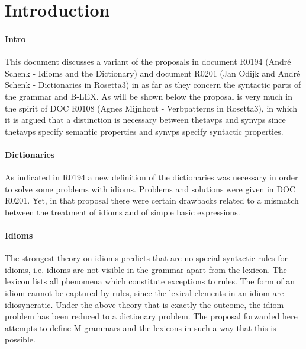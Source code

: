 

   \RosDate{\today}
   \RosSupersedes{-}
   \MakeRosTitle
%
%

\section{Introduction}
\paragraph{Intro}
This document discusses a variant of the proposals in document R0194 (Andr\'{e}
Schenk - Idioms and the Dictionary) and document R0201 (Jan Odijk and Andr\'{e}
Schenk - Dictionaries in Rosetta3) in as far as they concern the syntactic 
parts of the grammar and B-LEX. As will be shown below the proposal is very 
much in the spirit of DOC R0108 (Agnes Mijnhout - Verbpatterns in Rosetta3), in 
which it is argued that a distinction is necessary between thetavps and synvps 
since thetavps specify semantic properties and synvps specify syntactic 
properties.

\paragraph{Dictionaries}
As indicated in R0194 a new definition of the dictionaries was necessary in
order to solve some problems with idioms. Problems and solutions were given in
DOC R0201. Yet, in that proposal there were certain drawbacks related to a
mismatch between the treatment of idioms and of simple basic expressions. 

\paragraph{Idioms}
The strongest theory on idioms predicts that are no special syntactic rules for
idioms, i.e. idioms are not visible in the grammar apart from the lexicon. The
lexicon lists all phenomena which constitute exceptions to rules. The form of
an idiom cannot be captured by rules, since the lexical elements in an idiom
are idiosyncratic. Under the above theory that is exactly the outcome, the
idiom problem has been reduced to a dictionary problem. The proposal forwarded
here attempts to define M-grammars and the lexicons in such a way that this is
possible. 

